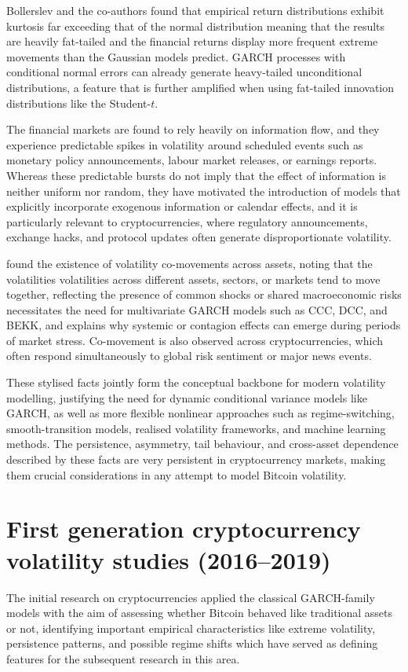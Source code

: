 \documentclass[12pt]{report}
\begin{document}
Bollerslev and the co-authors found that empirical return distributions exhibit  kurtosis far exceeding that of the normal distribution meaning that the results are heavily fat-tailed and the financial returns display more frequent extreme movements than the Gaussian models predict. GARCH processes with conditional normal errors can already generate heavy-tailed unconditional distributions, a feature that is further amplified when using fat-tailed innovation distributions like the Student-\(t\).

The financial markets are found to rely heavily on information flow, and they experience predictable spikes in volatility around scheduled events such as monetary policy announcements, labour market releases, or earnings reports. Whereas these predictable bursts do not imply that the effect of information is neither uniform nor random, they have motivated the introduction of models that explicitly incorporate exogenous information or calendar effects, and it is particularly relevant to cryptocurrencies, where regulatory announcements, exchange hacks, and protocol updates often generate disproportionate volatility.

\cite{bollerslev1994archsurvey} found the existence of volatility co-movements across assets, noting that the volatilities volatilities across different assets, sectors, or markets tend to move together, reflecting the presence of common shocks or shared macroeconomic risks necessitates the need for multivariate GARCH models such as CCC, DCC, and BEKK, and explains why systemic or contagion effects can emerge during periods of market stress. Co-movement is also observed across cryptocurrencies, which often respond simultaneously to global risk sentiment or major news events.


These stylised facts jointly form the conceptual backbone for modern volatility modelling, justifying the need for dynamic conditional variance models like GARCH, as well as more flexible nonlinear approaches such as regime-switching, smooth-transition models, realised volatility frameworks, and machine learning methods. The persistence, asymmetry, tail behaviour, and cross-asset dependence described by these facts are very persistent in cryptocurrency markets, making them crucial considerations in any attempt to model Bitcoin volatility.


\section{First generation cryptocurrency volatility studies (2016–2019)}
The initial research on cryptocurrencies applied the classical GARCH-family models with the aim of assessing whether Bitcoin behaved like traditional assets or not, identifying important empirical characteristics like extreme volatility, persistence patterns, and possible regime shifts which have served as defining features for the subsequent research in this area.
\end{document}

